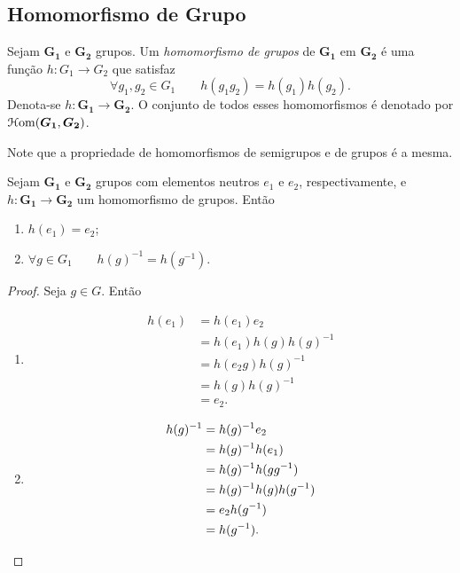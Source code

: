 \subsection{Homomorfismo de Grupo}

\begin{defi}
Sejam $\bm{G_1}$ e $\bm{G_2}$ grupos. Um \emph{homomorfismo de grupos} de $\bm{G_1}$ em $\bm{G_2}$ é uma função $h: G_1 \to G_2$ que satisfaz
	\begin{equation*}
	\forall g_1,g_2 \in G_1 \qquad h(g_1g_2)=h(g_1)h(g_2).
	\end{equation*}
Denota-se $h: \bm{G_1} \to \bm{G_2}$. O conjunto de todos esses homomorfismos é denotado por $\mathcal{H}\mathrm{om}(\bm{G_1},\bm{G_2})$.
\end{defi}

Note que a propriedade de homomorfismos de semigrupos e de grupos é a mesma.

\begin{prop}
\label{prop.hom.gru}
Sejam $\bm{G_1}$ e $\bm{G_2}$ grupos com elementos neutros $e_1$ e $e_2$, respectivamente, e $h: \bm{G_1} \to \bm{G_2}$ um homomorfismo de grupos. Então
	\begin{enumerate}
	\item $h(e_1)=e_2$;
	\item $\forall g \in G_1 \qquad h(g)^{-1}=h(g^{-1})$.
	\end{enumerate}
\end{prop}
\begin{proof}
Seja $g \in G$. Então
	\begin{enumerate}
	\item
		\begin{align*}
		h(e_1) &= h(e_1) e_2 \\
			&= h(e_1) h(g) h(g)^{-1} \\
			&= h(e_2 g) h(g)^{-1} \\
			&= h(g) h(g)^{-1} \\
			&= e_2.
		\end{align*}
	\item
		\begin{align*}
		h(g)^{-1} &= h(g)^{-1} e_2 \\
			&= h(g)^{-1} h(e_1) \\
			&= h(g)^{-1} h(g g^{-1}) \\
			&= h(g)^{-1} h(g) h(g^{-1}) \\
			&= e_2 h(g^{-1}) \\
			&= h(g^{-1}). \qedhere
		\end{align*}
	\end{enumerate}
\end{proof}

